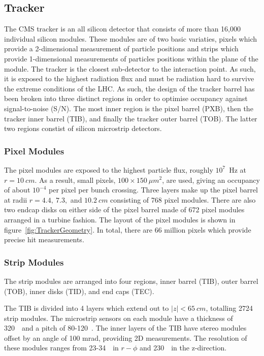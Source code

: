 \subsection{Tracker}
\label{sec:Tracker}

The CMS tracker is an all silicon detector that consists of more than 16,000
individual silicon modules.  These modules are of two basic variaties, pixels
which provide a 2-dimensional measurement of particle positions and strips
which provide 1-dimensional measurements of particles positions within the plane of the module.  The tracker
is the closest sub-detector to the interaction point.  As such, it is exposed 
to the highest radiation flux and must be radiation hard to survive the extreme
conditions of the LHC.  As such, the design of the tracker barrel has been 
broken into three distinct regions in order to optimise occupancy against
signal-to-noise (S/N).  The most inner region is the pixel barrel (PXB), then the tracker
inner barrel (TIB), and finally the tracker outer barrel (TOB).  The latter
two regions constist of silicon microstrip detectors. 

\subsubsection{Pixel Modules}

The pixel modules are exposed to the highest particle flux, roughly $10^7$~Hz
at $r=10~cm$.  As a result, small pixels, $100\times150~\mu m^2$, are used,
giving an occupancy of about $10^{-4}$ per pixel per bunch crossing. Three
layers make up the pixel barrel at radii $r=4.4,~7.3,$ and $10.2~cm$ consisting of 768 pixel modules.  There are also two endcap disks on either side of 
the pixel barrel made of 672 pixel modules arranged in a turbine fashion. 
The layout of the pixel modules is shown in figure~\ref{fig:TrackerGeometry}.
In total, there are 66 million pixels which provide precise hit measurements.

\subsubsection{Strip Modules}

The strip modules are arranged into four regions, inner barrel (TIB), 
outer barrel (TOB), inner disks (TID), and end caps (TEC). 

The TIB is divided into 4 layers which extend out to $|z|<65~cm$, totalling
2724 strip modules.  The microstrip sensors on each module have a thickness
of 320~\microns~and a pitch of 80-120~\microns. The inner layers of the TIB
have stereo modules offset by an angle of 100 mrad, providing 2D
measurements.  The resolution of these
modules ranges from 23-34~\microns~in $r-\phi$ and 230~\microns~in 
the z-direction.

